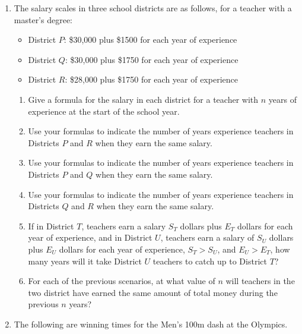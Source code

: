 \documentclass[
]{book}
\providecommand{\tightlist}{%
  \setlength{\itemsep}{0pt}\setlength{\parskip}{0pt}}
\theoremstyle{definition}
\theoremstyle{definition}
\theoremstyle{definition}
\theoremstyle{remark}
\begin{document}
\begin{enumerate}
\def\labelenumi{\arabic{enumi}.}
\item
  The salary scales in three school districts are as follows, for a teacher with a master's degree:

  \begin{itemize}
  \tightlist
  \item
    District \(P\): \$30,000 plus \$1500 for each year of experience
  \item
    District \(Q\): \$30,000 plus \$1750 for each year of experience
  \item
    District \(R\): \$28,000 plus \$1750 for each year of experience
  \end{itemize}

  \begin{enumerate}
  \def\labelenumii{\alph{enumii}.}
  \tightlist
  \item
    Give a formula for the salary in each district for a teacher with \(n\) years of experience at the start of the school year.
  \item
    Use your formulas to indicate the number of years experience teachers in Districts \(P\) and \(R\) when they earn the same salary.
  \item
    Use your formulas to indicate the number of years experience teachers in Districts \(P\) and \(Q\) when they earn the same salary.
  \item
    Use your formulas to indicate the number of years experience teachers in Districts \(Q\) and \(R\) when they earn the same salary.
  \item
    If in District \(T\), teachers earn a salary \(S_T\) dollars plus \(E_T\) dollars for each year of experience, and in District \(U\), teachers earn a salary of \(S_U\) dollars plus \(E_U\) dollars for each year of experience, \(S_T>S_U\), and \(E_U>E_T\), how many years will it take District \(U\) teachers to catch up to District \(T\)?
  \item
    For each of the previous scenarios, at what value of \(n\) will teachers in the two district have earned the same amount of total money during the previous \(n\) years?
  \end{enumerate}
\item
  The following are winning times for the Men's 100m dash at the Olympics.

  \begin{table}


\end{table}
\end{enumerate}
\end{document}
